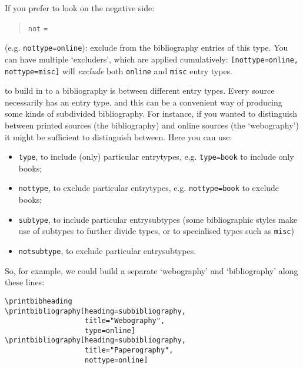 If you prefer to look on the negative side:
\begin{quote}
\texttt{not} \texttt{=} 
\end{quote}
(e.g. \texttt{nottype=online}): exclude from the bibliography entries of
this type. You can have multiple `excluders', which are applied
cumulatively: \texttt{{[}nottype=online,} \texttt{nottype=misc{]}} will
\emph{exclude} both \texttt{online} and \texttt{misc} entry types.

 to build in to a bibliography is
between different entry types. Every source necessarily has an entry
type, and this can be a convenient way of producing some kinds of
subdivided bibliography. For instance, if you wanted to distinguish
between printed sources (the bibliography) and online sources (the
`webography') it might be sufficient to distinguish between. Here you
can use: 
\begin{itemize}
\item \texttt{type}, to include (only) particular entrytypes, e.g.
\texttt{type=book} to include only books;
\item \texttt{nottype}, to exclude
particular entrytypes, e.g. \texttt{nottype=book} to exclude books;
\item \texttt{subtype}, to include particular entrysubtypes (some
bibliographic styles make use of subtypes to further divide types, or to
specialised types such as \texttt{misc}) 
\item \texttt{notsubtype}, to
exclude particular entrysubtypes.
\end{itemize}

So, for example, we could build a separate `webography' and `bibliography'
along these lines:

\begin{verbatim}
\printbibheading
\printbibliography[heading=subbibliography,
                   title="Webography",
                   type=online]
\printbibliography[heading=subbibliography,
                   title="Paperography",
                   nottype=online]
\end{verbatim}

